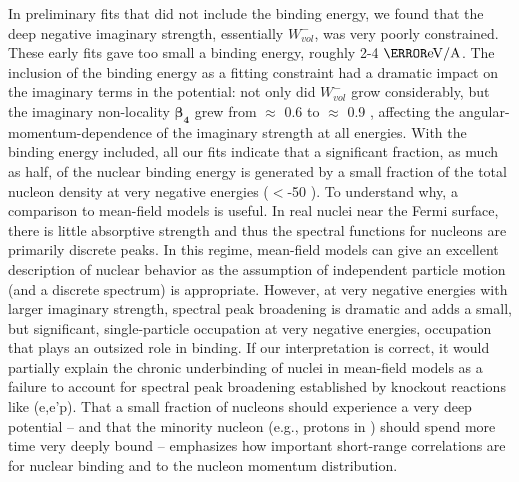 In preliminary fits that did not include the binding energy,
we found that the deep negative imaginary strength, essentially $W_{vol}^{-}$,
was very poorly constrained. These early fits gave too small a binding energy,
roughly 2-4 $\mega\electronvolt/\text{A}$.
The inclusion of the binding energy as a fitting constraint
had a dramatic impact on the imaginary terms in the potential: not only did
$W_{vol}^{-}$ grow considerably,
but the imaginary non-locality $\bm{\beta_{4}}$ grew from $\approx$
0.6 \femto\meter to $\approx$ 0.9 \femto\meter, affecting the
angular-momentum-dependence of the imaginary strength at all energies.
With the binding energy included, all our fits indicate that a significant
fraction, as much as half, of the nuclear binding energy is generated by a small
fraction of the total nucleon density at very negative energies ($<$-50 \mega\electronvolt).
To understand why, a comparison to mean-field models is useful.
In real nuclei near the Fermi surface, there is
little absorptive strength and thus the spectral functions for nucleons are
primarily discrete peaks. In this regime,
mean-field models can give an excellent description of nuclear behavior as the
assumption of independent particle motion (and a discrete spectrum) is appropriate.
However, at very negative energies with larger imaginary strength,
spectral peak broadening is dramatic and adds a small, but significant,
single-particle occupation at very negative energies, occupation
that plays an outsized role in binding. If our interpretation is
correct, it would partially explain the chronic underbinding of
nuclei in mean-field models as a failure to account for spectral peak broadening
established by knockout reactions like (e,e'p). That a small fraction of nucleons should experience a
very deep potential -- and that the minority nucleon (e.g., protons in \pbEight)
should spend more time very deeply bound -- emphasizes how important short-range
correlations are for nuclear binding and to the nucleon momentum distribution.

